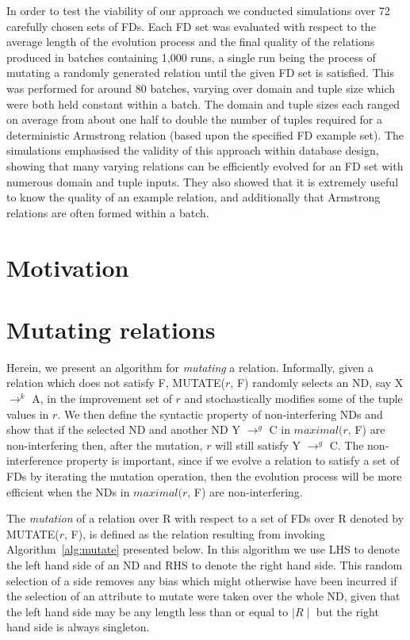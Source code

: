 In order to test the viability of our approach we conducted simulations
over 72 carefully chosen sets of FDs. 
 Each FD set was evaluated with respect to the average length of the
 evolution process and the final quality of the relations
 produced in batches
containing 1,000 runs, a single run being the process of mutating
a randomly generated relation until the given FD set is satisfied.
This was performed for around 80 batches, varying over domain and tuple
size which were both held constant within a batch. The domain and tuple
sizes each ranged on average from about one 
half to double the number of tuples required for a deterministic
Armstrong relation (based upon the specified FD example set).  The simulations
emphasised the validity of this approach within database
design, showing that many varying relations can be efficiently
evolved for an FD set with numerous domain and tuple inputs.
 They also showed that it is extremely useful to know the quality of an
 example relation, and additionally that Armstrong
relations are often formed within a batch. 




\section{Motivation}

\section{Mutating relations}
\label{sec:mutate}

Herein, we present an algorithm for {\em mutating} a relation.
Informally, given a relation which does not satisfy F, MUTATE($r$, F) 
randomly selects an ND, say X $\to^k$ A, in the improvement set of $r$ and 
stochastically modifies some of the tuple values in $r$.
We then define the syntactic property of non-interfering NDs 
and show that if the selected ND and another ND
Y $\to^g$ C in $maximal(r$, F) are non-interfering then, after the mutation, 
$r$ will still satisfy Y $\to^g$ C.
The non-interference property is important,
since if we evolve a relation to satisfy a set of FDs by iterating the
mutation operation, then the evolution process will be more efficient 
when the NDs in $maximal(r$, F) are non-interfering.

\medskip

The {\em mutation} of a relation over R with respect to a set of FDs over R 
denoted by MUTATE($r$, F), is defined as the relation resulting from invoking 
Algorithm~\ref{alg:mutate} presented below. In this algorithm we use LHS
 to denote the left hand side of an ND and RHS to denote the right hand
side.  This random selection of a side removes any bias which might otherwise
have been incurred if the selection of an attribute to mutate were
taken over the whole ND, given that the left hand side may be any
length less than or equal to $\mid R \mid$ but the right hand side is always singleton.


